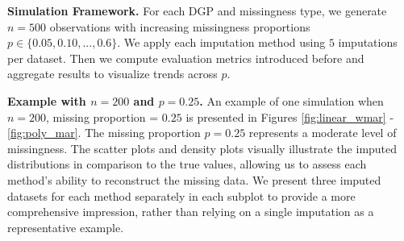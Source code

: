 \documentclass[12pt,oneside]{amsart}
\theoremstyle{definition}
\theoremstyle{remark}
\numberwithin{equation}{section}
\begin{document}
\textbf{Simulation Framework.}
For each DGP and missingness type, we generate $n = 500$ observations with increasing missingness proportions $p \in \{0.05, 0.10, ..., 0.6\}$. We apply each imputation method using $5$ imputations per dataset. Then we compute evaluation metrics introduced before and aggregate results to visualize trends across $p$. 

\textbf{Example with $n = 200$ and $p=0.25$.}
An example of one simulation when $n=200$, missing proportion = $0.25$ is presented in Figures \ref{fig:linear_wmar} - \ref{fig:poly_mar}. The missing proportion $p=0.25$ represents a moderate level of missingness. The scatter plots and density plots visually illustrate the imputed distributions in comparison to the true values, allowing us to assess each method’s ability to reconstruct the missing data. We present three imputed datasets for each method separately in each subplot to provide a more comprehensive impression, rather than relying on a single imputation as a representative example.
\\
\end{document}
